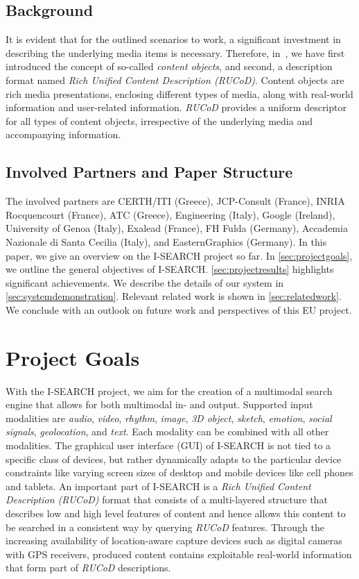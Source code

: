 \documentclass{acm_proc_article-sp}
\let\oldemph\emph
\renewcommand{\emph}[1]{\oldemph{\fontsize{9}{9}\selectfont #1}}
\begin{document}
\subsection{Background}
It is evident that for the outlined scenarios to work, a significant investment in describing the underlying media items is necessary.
Therefore, in~\cite{ijmis2010}, we have first introduced the concept of so-called \emph{content objects}, and second, a description format named \emph{Rich Unified Content Description \mbox{(RUCoD)}}.
Content objects are rich media presentations, enclosing different types of media, along with real-world information and user-related information.
\mbox{\emph{RUCoD}} provides a uniform descriptor for all types of content objects, irrespective of the underlying media and accompanying information.

\subsection{Involved Partners and Paper Structure}
The involved partners are CERTH/ITI (Greece), JCP-Consult (France), INRIA Rocquencourt (France), ATC (Greece), Engineering (Italy), Google (Ireland), University of Genoa (Italy), Exalead (France), FH Fulda (Germany), Accademia Nazionale di Santa Cecilia (Italy), and EasternGraphics (Germany).
In this paper, we give an overview on the \mbox{I-SEARCH} project so far.
In \autoref{sec:projectgoals}, we outline the general objectives of  \mbox{I-SEARCH}.
\autoref{sec:projectresults} highlights significant achievements.
We describe the details of our system in \autoref{sec:systemdemonstration}.
Relevant related work is shown in \autoref{sec:relatedwork}.
We conclude with an outlook on future work and perspectives of this EU project.

\section{Project Goals} \label{sec:projectgoals}
With the \mbox{I-SEARCH} project, we aim for the creation of a multimodal search engine that allows for both multimodal in- and output.
Supported input modalities are \emph{audio}, \emph{video}, \emph{rhythm}, \emph{image}, \emph{3D object}, \emph{sketch}, \emph{emotion}, \emph{social signals}, \emph{geolocation}, and \emph{text}.
Each modality can be combined with all other modalities.
The graphical user interface (GUI) of \mbox{I-SEARCH} is not tied to a specific class of devices, but rather dynamically adapts to the particular device constraints like varying screen sizes of desktop and mobile devices like cell phones and tablets.
An important part of \mbox{I-SEARCH} is a \emph{Rich Unified Content Description \mbox{(RUCoD)}} format that consists of a multi-layered structure that describes low and high level features of content and hence allows this content to be searched in a consistent way by querying \mbox{\emph{RUCoD}} features.
Through the increasing availability of location-aware capture devices such as digital cameras with GPS receivers, produced content contains exploitable real-world information that form part of \mbox{\emph{RUCoD}} descriptions.
\end{document}
